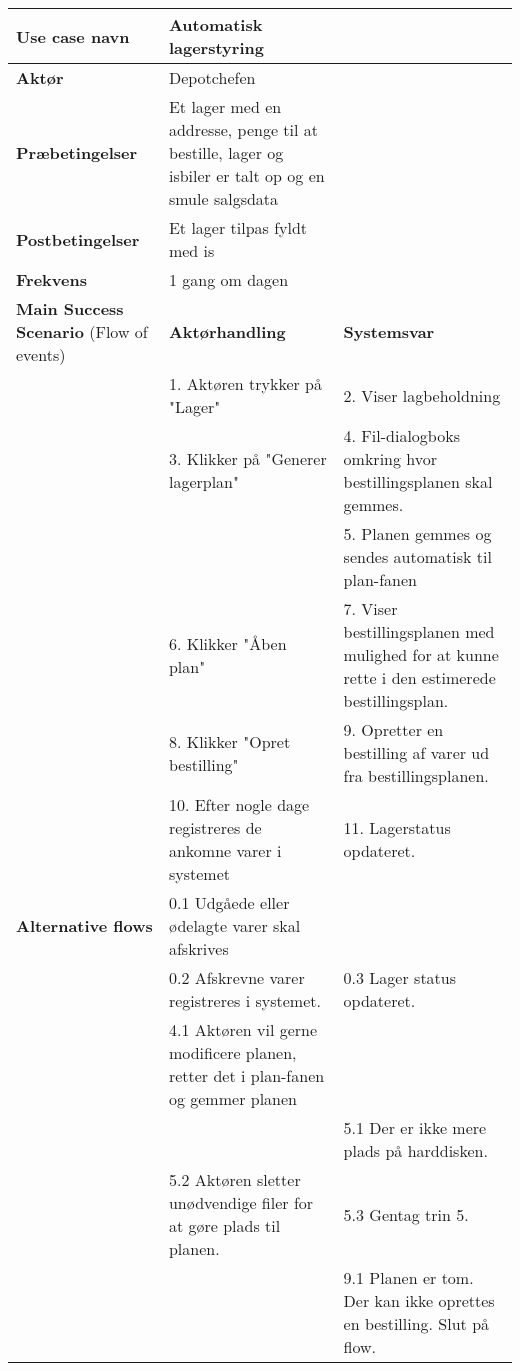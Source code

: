 \begin{longtable}{ |p{120pt}|p{120pt}|p{120pt}| }
    \hline
    \textbf{Use case navn} & Automatisk lagerstyring & \\
    \hline
    \textbf{Aktør} & Depotchefen & \\
    \hline
    \textbf{Præbetingelser} & Et lager med en addresse, penge til at bestille, lager og isbiler er talt op og en smule salgsdata & \\
    \hline
    \textbf{Postbetingelser} & Et lager tilpas fyldt med is & \\
    \hline
    \textbf{Frekvens} & 1 gang om dagen & \\
    \hline
    \textbf{Main Success Scenario} (Flow of events) & \textbf{Aktørhandling} & \textbf{Systemsvar} \\
    \hline
    & 1. Aktøren trykker på "Lager" & 2. Viser lagbeholdning \\
    \hline
    & 3. Klikker på "Generer lagerplan" & 4. Fil-dialogboks omkring hvor bestillingsplanen skal gemmes. \\
    & & 5. Planen gemmes og sendes automatisk til plan-fanen \\
    \hline
    & 6. Klikker "Åben plan" & 7. Viser bestillingsplanen med mulighed for at kunne rette i den estimerede bestillingsplan. \\
    \hline
    & 8. Klikker "Opret bestilling" & 9. Opretter en bestilling af varer ud fra bestillingsplanen. \\
    \hline
    & 10. Efter nogle dage registreres de ankomne varer i systemet & 11. Lagerstatus opdateret. \\
    \hline
    \textbf{Alternative flows} & 0.1 Udgåede eller ødelagte varer skal afskrives & \\
    \hline
    & 0.2 Afskrevne varer registreres i systemet. & 0.3 Lager status opdateret. \\
    \hline
    & 4.1 Aktøren vil gerne modificere planen, retter det i plan-fanen og gemmer planen & \\
    \hline
    & & 5.1 Der er ikke mere plads på harddisken. \\
    \hline
    & 5.2 Aktøren sletter unødvendige filer for at gøre plads til planen. & 5.3 Gentag trin 5.\\
    \hline
    & & 9.1 Planen er tom. Der kan ikke oprettes en bestilling. Slut på flow. \\
    \hline
\end{longtable}


